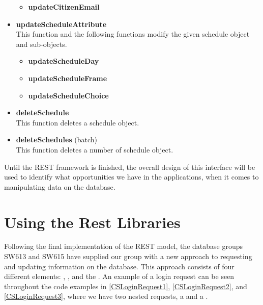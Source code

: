 \begin{itemize}
\begin{itemize}
        \item \textbf{updateCitizenEmail}
    \end{itemize}
    \item \textbf{updateScheduleAttribute}\\
    This function and the following functions modify the given schedule object and sub-objects.
    \begin{itemize}
        \item \textbf{updateScheduleDay}
        \item \textbf{updateScheduleFrame}
        \item \textbf{updateScheduleChoice}
    \end{itemize}
    \item \textbf{deleteSchedule}\\
    This function deletes a schedule object.
    \item \textbf{deleteSchedules} (batch)\\
    This function deletes a number of schedule object.
\end{itemize}

Until the REST framework is finished, the overall design of this interface
will be used to identify what opportunities we have in the applications, when it
comes to manipulating data on the database.

\section{Using the Rest Libraries}\label{UsingRest}
Following the final implementation of the REST model, the database groups SW613
and SW615 have supplied our group with a new approach to requesting and updating
information on the database. This approach consists of four different
elements: , , 
and the . An example of a login request can be seen throughout the
code examples in \autoref{CSLoginRequest1}, \autoref{CSLoginRequest2}, and
\autoref{CSLoginRequest3}, where we have two nested requests, a
 and a .\nl

